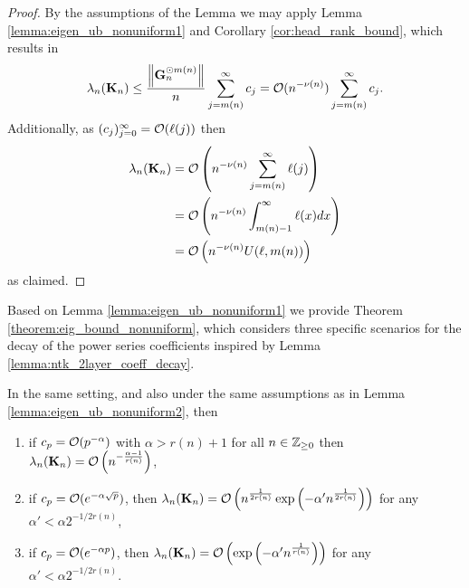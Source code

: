 \begin{proof}
     By the assumptions of the Lemma we may apply Lemma \ref{lemma:eigen_ub_nonuniform1} and Corollary \ref{cor:head_rank_bound}, which results in
    \[
        \lambda_{n}(\mathbf{K}_n) \leq \frac{\left\lVert\mathbf{G}_n^{\odot m(n)}\right\rVert}{n} \sum_{j=m(n)}^{\infty} c_j = \mathcal{O}(n^{-\nu(n)}) \sum_{j=m(n)}^{\infty} c_j.
    \]
    Additionally, as $(c_j)_{j=0}^{\infty}= \mathcal{O}(\ell(j))$ then
    \[
    \begin{aligned}
        \lambda_{n}(\mathbf{K}_n) &= \mathcal{O}\left(n^{-\nu(n)} \sum_{j=m(n)}^{\infty} \ell(j)\right)\\
        &= \mathcal{O} \left( n^{-\nu(n)} \int_{m(n)-1}^{\infty} \ell(x) dx \right)\\ 
        & = \mathcal{O} \left( n^{-\nu(n)}  U(\ell, m(n)) \right)
    \end{aligned}
    \]
    as claimed.
\end{proof}


Based on Lemma \ref{lemma:eigen_ub_nonuniform1} we provide Theorem \ref{theorem:eig_bound_nonuniform}, which considers three specific scenarios for the decay of the power series coefficients inspired by Lemma \ref{lemma:ntk_2layer_coeff_decay}.

\begin{theorem}\label{theorem:eig_bound_nonuniform} 
    In the same setting, and also under the same assumptions as in Lemma \ref{lemma:eigen_ub_nonuniform2}, then
    \begin{enumerate}
        \item 
        if $c_p = \mathcal{O}(p^{-\alpha})$ with $\alpha > r(n)+1$ for all $n \in \mathbb{Z}_{\geq 0}$ then $\lambda_{n}(\mathbf{K}_n) = \mathcal{O}\left(n^{-\frac{\alpha - 1}{r(n)}}\right)$,
        \item 
        if $c_p = \mathcal{O}(e^{-\alpha \sqrt{p}})$, then $\lambda_{n}(\mathbf{K}_n) = \mathcal{O} \left(n^{\frac{1}{2r(n)}} \exp \left(-\alpha' n^{\frac{1}{2r(n)}} \right) \right)$ for any $\alpha' < \alpha 2^{-1/2r(n)}$,
        \item  
        if $c_p = \mathcal{O}(e^{-\alpha p})$, then $\lambda_{n}(\mathbf{K}_n) = \mathcal{O}\left(\exp\left(-\alpha' n^{\frac{1}{r(n)}}\right)\right)$ for any $\alpha' < \alpha 2^{-1/2r(n)}$. 
    \end{enumerate}
\end{theorem}


